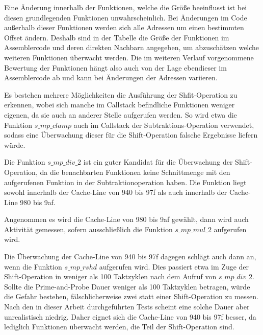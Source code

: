 Eine Änderung innerhalb der Funktionen, welche die Größe beeinflusst ist bei diesen grundlegenden Funktionen unwahrscheinlich.
Bei Änderungen im Code außerhalb dieser Funktionen werden sich alle Adressen um einen bestimmten Offset ändern.
Deshalb sind in der Tabelle die Größe der Funktionen im Assemblercode und deren direkten Nachbarn angegeben, um abzuschätzen welche weiteren Funktionen überwacht werden.
Die im weiteren Verlauf vorgenommene Bewertung der Funktionen hängt also auch von der Lage ebendieser im Assemblercode ab und kann bei Änderungen der Adressen variieren.

Es bestehen mehrere Möglichkeiten die Ausführung der Shfit-Operation zu erkennen, wobei sich manche im Callstack befindliche Funktionen weniger eigenen, da sie auch an anderer Stelle aufgerufen werden.
So wird etwa die Funktion $s\_mp\_clamp$ auch im Callstack der Subtraktions-Operation verwendet, sodass eine Überwachung dieser für die Shift-Operation falsche Ergebnisse liefern würde.

Die Funktion $s\_mp\_div\_2$ ist ein guter Kandidat für die Überwachung der Shift-Operation, da die benachbarten Funktionen keine Schnittmenge mit den aufgerufenen Funktion in der Subtraktionoperation haben.
Die Funktion liegt sowohl innerhalb der Cache-Line von 940 bis 97f als auch innerhalb der Cache-Line 980 bis 9af.

Angenommen es wird die Cache-Line von 980 bis 9af gewählt, dann wird auch Aktivität gemessen, sofern ausschließlich die Funktion $s\_mp\_mul\_2$ aufgerufen wird.

Die Überwachung der Cache-Line von 940 bis 97f dagegen schlägt auch dann an, wenn die Funktion $s\_mp\_rshd$ aufgerufen wird.
Dies passiert etwa im Zuge der Shift-Operation in weniger als 100 Taktzyklen nach dem Aufruf von $s\_mp\_div\_2$.
Sollte die Prime-and-Probe Dauer weniger als 100 Taktzyklen betragen, würde die Gefahr bestehen, fälschlicherweise zwei statt einer Shift-Operation zu messen.
Nach den in dieser Arbeit durchgeführten Tests scheint eine solche Dauer aber unrealistisch niedrig.
Daher eignet sich die Cache-Line von 940 bis 97f besser, da lediglich Funktionen überwacht werden, die Teil der Shift-Operation sind.


